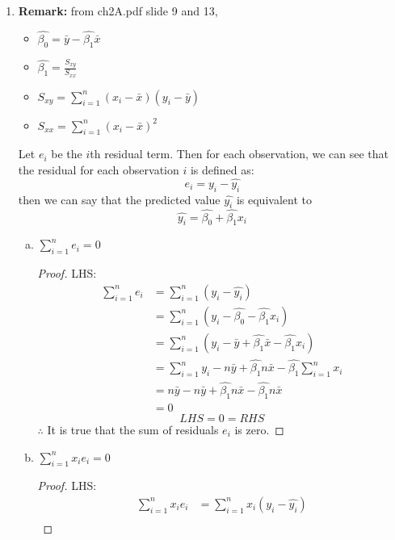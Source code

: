 \documentclass[12pt]{article}
\begin{document}
\begin{enumerate}[1.]
    \item \textbf{Remark:} from ch2A.pdf slide 9 and 13,
        \begin{itemize}
            \item $\hat{\beta_0} = \bar{y} - \hat{\beta_1}\bar{x}$
            \item $\hat{\beta_1} = \frac{S_{xy}}{S_{xx}}$
            \item $S_{xy} = \sum_{i=1}^{n} (x_i - \bar{x})(y_i - \bar{y})$
            \item $S_{xx} = \sum_{i=1}^{n} (x_i - \bar{x})^2$
        \end{itemize}
        Let $e_i$ be the $i$th residual term. Then for each observation, we can see that
            the residual for each observation $i$ is defined as: 
            \[e_i = y_i - \hat{y_i}\]
            then we can say that the predicted value $\hat{y_i}$ is equivalent to
            \[\hat{y_i} = \hat{\beta_0} + \hat{\beta_1} x_i \]
    \begin{enumerate}[(a)]   
        \item $\sum_{i=1}^{n} e_i = 0$
            \begin{proof}
                LHS$\colon$
                \begin{align*}
                    \sum_{i=1}^{n} e_i &= \sum_{i=1}^{n} (y_i - \hat{y_i}) \\
                    &= \sum_{i=1}^{n} (y_i - \hat{\beta_0} - \hat{\beta_1} x_i) \\
                    &= \sum_{i=1}^{n}(y_i - \bar{y} + \hat{\beta_1}\bar{x} - \hat{\beta_1} x_i) \\
                    &= \sum_{i=1}^{n}y_i - n\bar{y} + \hat{\beta_1}n\bar{x} - \hat{\beta_1} \sum_{i=1}^{n}x_i \\
                    &= n\bar{y} - n\bar{y} + \hat{\beta_1}n\bar{x} - \hat{\beta_1}n\bar{x} \\ 
                    &= 0
                \end{align*}
                \[LHS = 0 = RHS\]
                $\therefore$ It is true that the sum of residuals $e_i$ is zero.
            \end{proof}
        \item $\sum_{i=1}^{n} x_i e_i = 0$
            \begin{proof}
                LHS$\colon$
                \begin{align*}
                    \sum_{i=1}^{n} x_i e_i &= \sum_{i=1}^{n} x_i (y_i - \hat{y_i}) \\

\end{align*}
\end{proof}
\end{enumerate}
\end{enumerate}
\end{document}
